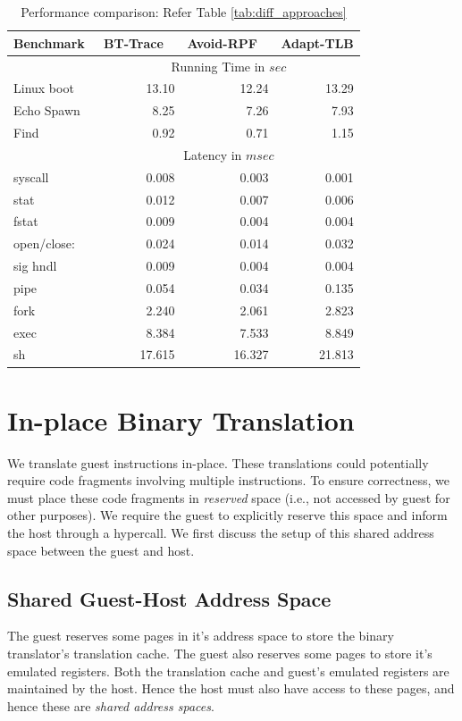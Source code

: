 \documentclass[10pt,twocolumn]{article}
\begin{document}
\begin{table}
\centering
\caption{Performance comparison: Refer Table \ref{tab:diff_approaches}}
      \begin{tabular}{|l|  r r r |} \hline
	         Benchmark\verb, ,& BT-Trace \verb, ,& Avoid-RPF \verb, , & Adapt-TLB  \\ \hline

     & \multicolumn{3}{c|}{ Running Time in $sec$}\\ \cline {2-4}  
     Linux boot	&	13.10	&	12.24	&	13.29		\\
Echo Spawn	&	8.25	&	7.26	&	7.93	\\
Find	&	0.92	&	0.71	&	1.15	\\ \cline{2-4}
	   
     & \multicolumn{3}{c|}{Latency in $msec$}\\  \cline{2-4}
syscall	&	0.008	&	0.003	&	0.001		\\
stat	&	0.012	&	0.007	&	0.006		\\
fstat	&	0.009	&	0.004	&	0.004		\\
open/close:	&	0.024	&	0.014	&		0.032	\\
sig hndl	&	0.009	&	0.004	&		0.004	\\
pipe 	&	0.054	&	0.034	&	0.135		\\
fork	&	2.240	&	2.061	&	2.823		\\
exec	&	8.384	&	7.533	&	8.849		\\
sh	&	17.615	&	16.327	&	21.813		\\        \hline
      \end{tabular}
\label{tab:detailed_results}
\end{table} 

\section{In-place Binary Translation}
\label{sec:bintrans}
We translate guest instructions in-place. These translations could potentially
require code fragments involving multiple instructions. To ensure correctness, we
must place these code fragments in {\em reserved} space (i.e., not accessed by
guest for other purposes). We require the guest to explicitly reserve this space
and inform the host through a hypercall. We first discuss the setup of this shared
address space between the guest and host.
\subsection{Shared Guest-Host Address Space}
\label{sec:sharedspace}
The guest reserves some pages in it's address space to store the
binary translator's translation
cache. The guest also reserves some pages to store it's emulated registers.
Both the translation cache and guest's emulated registers are maintained by
the host. Hence the host must also have access to these pages, and hence these
are {\em shared address spaces}.
\end{document}
